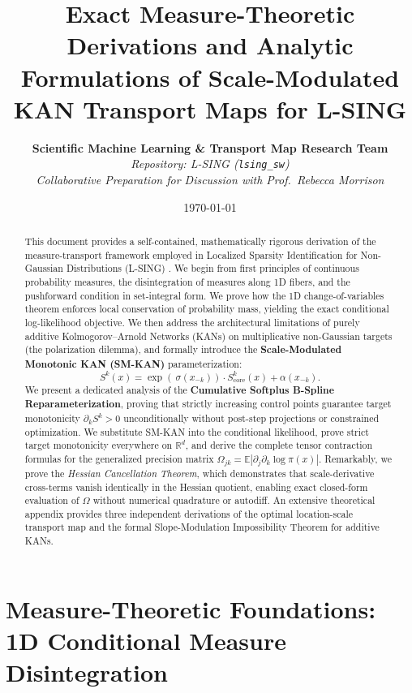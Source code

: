 \documentclass[11pt,a4paper]{article}
\title{\textbf{Exact Measure-Theoretic Derivations and Analytic Formulations of Scale-Modulated KAN Transport Maps for L-SING}}
\author{\textbf{Scientific Machine Learning \& Transport Map Research Team} \\
\textit{Repository: L-SING (\texttt{lsing\_sw})} \\
\textit{Collaborative Preparation for Discussion with Prof.~Rebecca Morrison}}
\date{\today}
\theoremstyle{plain}
\theoremstyle{definition}
\theoremstyle{remark}
\begin{document}
\maketitle

\begin{abstract}
This document provides a self-contained, mathematically rigorous derivation of the measure-transport framework employed in Localized Sparsity Identification for Non-Gaussian Distributions (L-SING) \cite{liaw2025learning}. We begin from first principles of continuous probability measures, the disintegration of measures along 1D fibers, and the pushforward condition in set-integral form. We prove how the 1D change-of-variables theorem enforces local conservation of probability mass, yielding the exact conditional log-likelihood objective. We then address the architectural limitations of purely additive Kolmogorov--Arnold Networks (KANs) on multiplicative non-Gaussian targets (the polarization dilemma), and formally introduce the \textbf{Scale-Modulated Monotonic KAN (SM-KAN)} parameterization:
\[
    S^k(x) = \exp\left( \ \sigma(x_{-k}) \right) \cdot S^k_{\text{core}}(x) + \alpha(x_{-k}).
\]
We present a dedicated analysis of the \textbf{Cumulative Softplus B-Spline Reparameterization}, proving that strictly increasing control points guarantee target monotonicity $\partial_k S^k > 0$ unconditionally without post-step projections or constrained optimization. We substitute SM-KAN into the conditional likelihood, prove strict target monotonicity everywhere on $\mathbb{R}^d$, and derive the complete tensor contraction formulas for the generalized precision matrix $\Omega_{jk} = \mathbb{E}\left|\partial_j \partial_k \log \pi(x)\right|$. Remarkably, we prove the \textit{Hessian Cancellation Theorem}, which demonstrates that scale-derivative cross-terms vanish identically in the Hessian quotient, enabling exact closed-form evaluation of $\Omega$ without numerical quadrature or autodiff. An extensive theoretical appendix provides three independent derivations of the optimal location-scale transport map and the formal Slope-Modulation Impossibility Theorem for additive KANs.
\end{abstract}

\tableofcontents
\newpage

\section{Measure-Theoretic Foundations: 1D Conditional Measure Disintegration}
\end{document}
